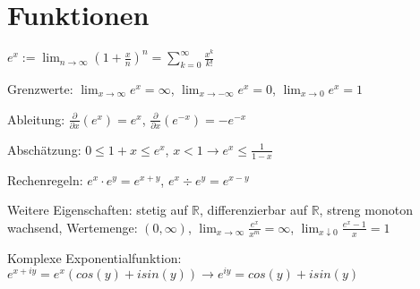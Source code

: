 \documentclass[]{article}
\begin{document}
\pagebreak

 	
\section{Funktionen}


\begin{definition}[Exponentialfunktion]
	$e^x := \lim_{n \rightarrow \infty} (1 + \frac{x}{n})^n = \sum_{k=0}^{\infty} \frac{x^k}{k!}$
	\begin{description} [noitemsep]
		\item Grenzwerte: $\lim_{x \rightarrow \infty} e^x = \infty$, $\lim_{x \rightarrow -\infty} e^x = 0$, $\lim_{x \rightarrow 0} e^x = 1$
		\item Ableitung: $\frac{\partial}{\partial x}(e^x) = e^x$, $\frac{\partial}{\partial x}(e^{-x}) = -e^{-x}$		
		\item Abschätzung: $ 0 \leq 1 + x \leq e^x$,  $x < 1 \rightarrow e^x \leq \frac{1}{1 - x}$ 
		\item Rechenregeln: $e^x \cdot e^y = e^{x+y}$, $e^x \div e^y = e^{x-y}$
		\item Weitere Eigenschaften: stetig auf $\mathbb{R}$, differenzierbar auf $\mathbb{R}$, streng monoton wachsend, Wertemenge: $(0, \infty)$, $\lim_{x \rightarrow \infty} \frac{e^x}{x^m} = \infty$, $\lim_{x \downarrow 0} \frac{e^x - 1}{x} = 1$
		\item Komplexe Exponentialfunktion: $e^{x+iy} = e^x(cos(y) + i sin(y)) \rightarrow e^{iy} = cos(y) + i sin(y)$
	\end{description}
\end{definition}
\end{document}
